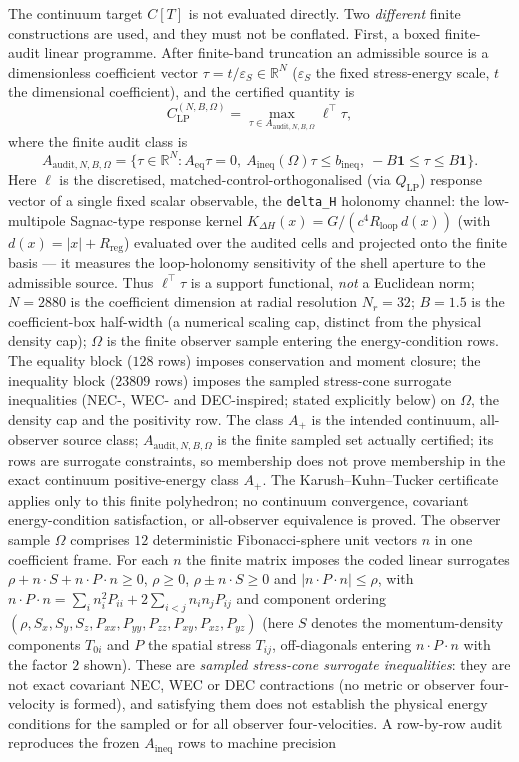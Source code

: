 \documentclass[11pt,a4paper]{article}
\begin{document}
The continuum target $C[T]$ is not evaluated directly. Two \emph{different} finite constructions are used, and they must not be conflated. First, a boxed finite-audit linear programme. After finite-band truncation an admissible source is a dimensionless coefficient vector $\tau=t/\varepsilon_{S}\in\mathbb{R}^{N}$ ($\varepsilon_{S}$ the fixed stress-energy scale, $t$ the dimensional coefficient), and the certified quantity is
\[
C_{\mathrm{LP}}^{(N,B,\Omega)} = \max_{\tau\in A_{\mathrm{audit},N,B,\Omega}} \ell^{\top}\tau,
\]
where the finite audit class is
\[
A_{\mathrm{audit},N,B,\Omega}=\bigl\{\tau\in\mathbb{R}^{N}: A_{\mathrm{eq}}\tau=0,\ A_{\mathrm{ineq}}(\Omega)\tau\le b_{\mathrm{ineq}},\ -B\mathbf{1}\le\tau\le B\mathbf{1}\bigr\}.
\]
Here $\ell$ is the discretised, matched-control-orthogonalised (via $Q_{\mathrm{LP}}$) response vector of a single fixed scalar observable, the \texttt{delta\_H} holonomy channel: the low-multipole Sagnac-type response kernel $K_{\Delta H}(x)=G/(c^{4}R_{\mathrm{loop}}\,d(x))$ (with $d(x)=|x|+R_{\mathrm{reg}}$) evaluated over the audited cells and projected onto the finite basis --- it measures the loop-holonomy sensitivity of the shell aperture to the admissible source. Thus $\ell^{\top}\tau$ is a support functional, \emph{not} a Euclidean norm; $N=2880$ is the coefficient dimension at radial resolution $N_{r}=32$; $B=1.5$ is the coefficient-box half-width (a numerical scaling cap, distinct from the physical density cap); $\Omega$ is the finite observer sample entering the energy-condition rows. The equality block ($128$ rows) imposes conservation and moment closure; the inequality block ($23809$ rows) imposes the sampled stress-cone surrogate inequalities (NEC-, WEC- and DEC-inspired; stated explicitly below) on $\Omega$, the density cap and the positivity row. The class $A_{+}$ is the intended continuum, all-observer source class; $A_{\mathrm{audit},N,B,\Omega}$ is the finite sampled set actually certified; its rows are surrogate constraints, so membership does not prove membership in the exact continuum positive-energy class $A_{+}$. The Karush--Kuhn--Tucker certificate applies only to this finite polyhedron; no continuum convergence, covariant energy-condition satisfaction, or all-observer equivalence is proved. The observer sample $\Omega$ comprises $12$ deterministic Fibonacci-sphere unit vectors $n$ in one coefficient frame. For each $n$ the finite matrix imposes the coded linear surrogates $\rho+n\!\cdot\!S+n\!\cdot\!P\!\cdot\!n\ge0$, $\rho\ge0$, $\rho\pm n\!\cdot\!S\ge0$ and $|n\!\cdot\!P\!\cdot\!n|\le\rho$, with $n\!\cdot\!P\!\cdot\!n=\sum_{i}n_{i}^{2}P_{ii}+2\sum_{i<j}n_{i}n_{j}P_{ij}$ and component ordering $(\rho,S_{x},S_{y},S_{z},P_{xx},P_{yy},P_{zz},P_{xy},P_{xz},P_{yz})$ (here $S$ denotes the momentum-density components $T_{0i}$ and $P$ the spatial stress $T_{ij}$, off-diagonals entering $n\!\cdot\!P\!\cdot\!n$ with the factor $2$ shown). These are \emph{sampled stress-cone surrogate inequalities}: they are not exact covariant NEC, WEC or DEC contractions (no metric or observer four-velocity is formed), and satisfying them does not establish the physical energy conditions for the sampled or for all observer four-velocities. A row-by-row audit reproduces the frozen $A_{\mathrm{ineq}}$ rows to machine precision 
\end{document}
